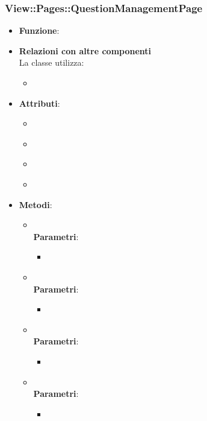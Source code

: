 \subsubsection{View::Pages::QuestionManagementPage}
\begin{itemize}
\item\textbf{Funzione}:
\item\textbf{Relazioni con altre componenti}\\
La classe utilizza:
	\begin{itemize}
		\item
	\end{itemize}
\item\textbf{Attributi}:
	\begin{itemize}
		\item\code{}\\
		\item\code{}\\
		\item\code{}\\
		\item\code{}\\
	\end{itemize}
\item\textbf{Metodi}:
	\begin{itemize}
		\item\code{}\\
		\textbf{Parametri}:
			\begin{itemize}
				\item\code{}\\
			\end{itemize}
		\item\code{}\\
		\textbf{Parametri}:
			\begin{itemize}
				\item\code{}\\
			\end{itemize}
		\item\code{}\\
		\textbf{Parametri}:
			\begin{itemize}
				\item\code{}\\
			\end{itemize}
		\item\code{}\\
		\textbf{Parametri}:
			\begin{itemize}
				\item\code{}\\
			\end{itemize}
	\end{itemize}
\end{itemize}

